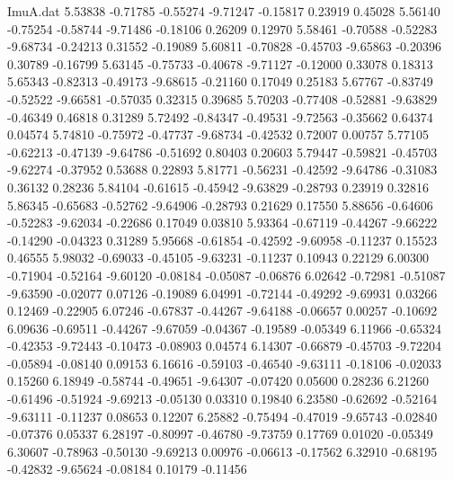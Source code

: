\begin{filecontents}{ImuA.dat}
   5.53838   -0.71785   -0.55274   -9.71247   -0.15817    0.23919    0.45028
   5.56140   -0.75254   -0.58744   -9.71486   -0.18106    0.26209    0.12970
   5.58461   -0.70588   -0.52283   -9.68734   -0.24213    0.31552   -0.19089
   5.60811   -0.70828   -0.45703   -9.65863   -0.20396    0.30789   -0.16799
   5.63145   -0.75733   -0.40678   -9.71127   -0.12000    0.33078    0.18313
   5.65343   -0.82313   -0.49173   -9.68615   -0.21160    0.17049    0.25183
   5.67767   -0.83749   -0.52522   -9.66581   -0.57035    0.32315    0.39685
   5.70203   -0.77408   -0.52881   -9.63829   -0.46349    0.46818    0.31289
   5.72492   -0.84347   -0.49531   -9.72563   -0.35662    0.64374    0.04574
   5.74810   -0.75972   -0.47737   -9.68734   -0.42532    0.72007    0.00757
   5.77105   -0.62213   -0.47139   -9.64786   -0.51692    0.80403    0.20603
   5.79447   -0.59821   -0.45703   -9.62274   -0.37952    0.53688    0.22893
   5.81771   -0.56231   -0.42592   -9.64786   -0.31083    0.36132    0.28236
   5.84104   -0.61615   -0.45942   -9.63829   -0.28793    0.23919    0.32816
   5.86345   -0.65683   -0.52762   -9.64906   -0.28793    0.21629    0.17550
   5.88656   -0.64606   -0.52283   -9.62034   -0.22686    0.17049    0.03810
   5.93364   -0.67119   -0.44267   -9.66222   -0.14290   -0.04323    0.31289
   5.95668   -0.61854   -0.42592   -9.60958   -0.11237    0.15523    0.46555
   5.98032   -0.69033   -0.45105   -9.63231   -0.11237    0.10943    0.22129
   6.00300   -0.71904   -0.52164   -9.60120   -0.08184   -0.05087   -0.06876
   6.02642   -0.72981   -0.51087   -9.63590   -0.02077    0.07126   -0.19089
   6.04991   -0.72144   -0.49292   -9.69931    0.03266    0.12469   -0.22905
   6.07246   -0.67837   -0.44267   -9.64188   -0.06657    0.00257   -0.10692
   6.09636   -0.69511   -0.44267   -9.67059   -0.04367   -0.19589   -0.05349
   6.11966   -0.65324   -0.42353   -9.72443   -0.10473   -0.08903    0.04574
   6.14307   -0.66879   -0.45703   -9.72204   -0.05894   -0.08140    0.09153
   6.16616   -0.59103   -0.46540   -9.63111   -0.18106   -0.02033    0.15260
   6.18949   -0.58744   -0.49651   -9.64307   -0.07420    0.05600    0.28236
   6.21260   -0.61496   -0.51924   -9.69213   -0.05130    0.03310    0.19840
   6.23580   -0.62692   -0.52164   -9.63111   -0.11237    0.08653    0.12207
   6.25882   -0.75494   -0.47019   -9.65743   -0.02840   -0.07376    0.05337
   6.28197   -0.80997   -0.46780   -9.73759    0.17769    0.01020   -0.05349
   6.30607   -0.78963   -0.50130   -9.69213    0.00976   -0.06613   -0.17562
   6.32910   -0.68195   -0.42832   -9.65624   -0.08184    0.10179   -0.11456

\end{filecontents}
